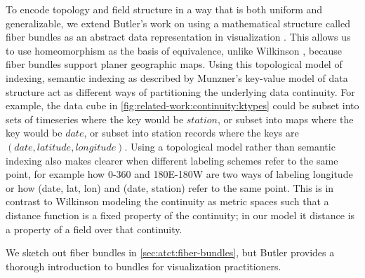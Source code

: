 \documentclass[review]{vgtc}
\theoremstyle{definition}
\theoremstyle{remark}
\begin{document}
To encode topology and field structure in a way that is both uniform and generalizable, we extend Butler's work on using a mathematical structure called fiber bundles as an abstract data representation in visualization \cite{butlerVectorBundleClassesForm1992, butlerVisualizationModelBased1989}. This allows us to use homeomorphism as the basis of equivalence, unlike Wilkinson \cite{wilkinsonGrammarGraphics2005}, because fiber bundles support planer geographic maps. Using this topological model of indexing, semantic indexing as described by Munzner's key-value model of data structure \cite{munznerWhatDataAbstraction2014} act as different ways of partitioning the underlying data continuity. For example, the data cube in \autoref{fig:related-work:continuity:ktypes} could be subset into sets of timeseries where the key would be $station$, or subset into maps where the key would be $date$, or subset into station records where the keys are $(date, latitude, longitude)$. Using a topological model rather than semantic indexing also makes clearer when different labeling schemes refer to the same point, for example how 0-360 and 180E-180W are two ways of labeling longitude or how (date, lat, lon) and (date, station) refer to the same point. This is in contrast to Wilkinson modeling the continuity as metric spaces \cite{wilkinsonGrammarGraphics2005}such that a distance function is a fixed property of the continuity; in our model it distance is a property of a field over that continuity.



We sketch out fiber bundles in \autoref{sec:atct:fiber-bundles}, but Butler provides a thorough introduction to bundles for visualization practitioners.
\end{document}
